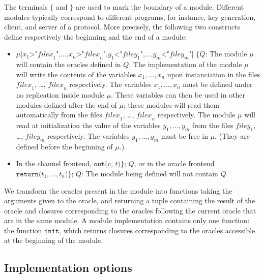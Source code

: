 The terminals $\texttt{\{}$ and $\texttt{\}}$ are used to mark the boundary
of a module. Different modules typically correspond to different
programs, for instance, key generation, client, and server of a protocol.
More precisely, the following two constructs define respectively the beginning and the end of a
module:
\begin{itemize}
\item $\mu\texttt{[}x_1\texttt{>"}\mathit{filex}_1\texttt{",} \ldots\texttt{,} x_n\texttt{>"}\mathit{filex}_n\texttt{",} y_1\texttt{<"}\mathit{filey}_1\texttt{",} \ldots\texttt{,} y_m\texttt{<"}\mathit{filey}_m\texttt{"] \{ } Q$:
The module $\mu$ will contain the oracles defined in $Q$.
The implementation of the module $\mu$ will write the contents of the
variables $x_1, \ldots, x_n$ upon instanciation in the files $\mathit{filex}_1$, \ldots, $\mathit{filex}_n$ respectively. The variables
$x_1, \ldots, x_n$ must be defined under no replication inside module $\mu$. 
These variables can then be used in other modules defined after the end of $\mu$;
these modules will read them automatically from the files $\mathit{filex}_1$, \ldots, $\mathit{filex}_n$ respectively.
The module $\mu$ will read at initialization the value
of the variables $y_1, \ldots, y_m$ from the files $\mathit{filey}_1$, \ldots, $\mathit{filey}_m$ respectively.
The variables $y_1, \ldots, y_m$ must be free in $\mu$. (They are defined before the
beginning of $\mu$.)

\item In the channel frontend, $\texttt{out(}c\texttt{,
  }t\texttt{)}\texttt{\}}\texttt{; }Q$, or in the oracle frontend
  $\texttt{return(}t_1,\ldots,t_n\texttt{)}\texttt{\}}\texttt{; }Q$:
The module being defined will not contain $Q$.
\end{itemize}
We transform the oracles present in the module into functions taking the
arguments given to the oracle, and returning a tuple containing 
the result of the oracle and closures corresponding
to the oracles following the current oracle that are in the same module. 
A module implementation
contains only one function: the function $\texttt{init}$, which returns
closures corresponding to the oracles accessible at the beginning of the module.



\subsection{Implementation options}
\label{sec:implopt}

